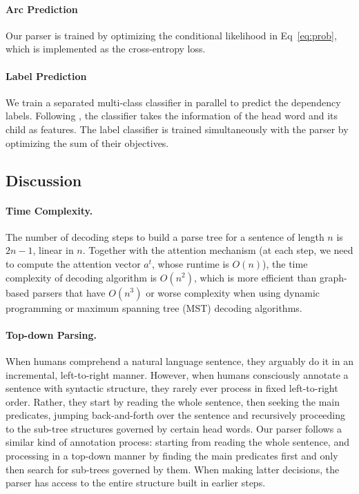 \documentclass[11pt,a4paper]{article}
\begin{document}
\paragraph{Arc Prediction}
Our parser is trained by optimizing the conditional likelihood in Eq~\eqref{eq:prob}, which is implemented as the cross-entropy loss.

\paragraph{Label Prediction}We train a separated multi-class classifier in parallel to predict the dependency labels. Following \citet{dozat2017:ICLR}, the classifier takes the information of the head word and its child as features. The label classifier is trained simultaneously with the parser by optimizing the sum of their objectives. 

\subsection{Discussion}\label{subsec:discuss}
\paragraph{Time Complexity.} The number of decoding steps to build a parse tree for a sentence of length $n$ is $2n-1$, linear in $n$. 
Together with the attention mechanism (at each step, we need to compute the attention vector $a^t$, whose runtime is $O(n)$), the time complexity of decoding algorithm is $O(n^2)$, which is more efficient than graph-based parsers that have $O(n^3)$ or worse complexity when using dynamic programming or maximum spanning tree (MST) decoding algorithms.
\paragraph{Top-down Parsing.} When humans comprehend a natural language sentence, they arguably do it in an incremental, left-to-right manner.
However, when humans consciously annotate a sentence with syntactic structure, they rarely ever process in fixed left-to-right order.
Rather, they start by reading the whole sentence, then seeking the main predicates, jumping back-and-forth over the sentence and recursively proceeding to the sub-tree structures governed by certain head words. 
Our parser follows a similar kind of annotation process: starting from reading the whole sentence, and processing in a top-down manner by finding the main predicates first and only then search for sub-trees governed by them. When making latter decisions, the parser has access to the entire structure built in earlier steps.
\end{document}
